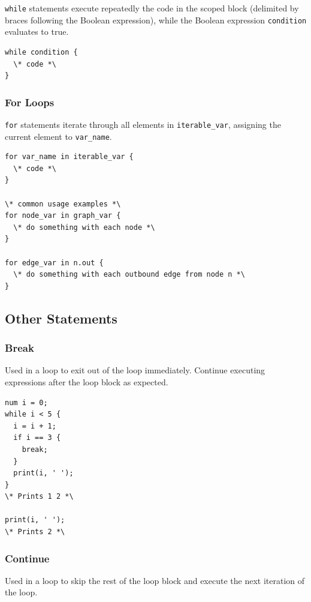 \documentclass{article}
\newcommand{\code}[1]{\texttt{#1}} %
\begin{document}
\code{while} statements execute repeatedly the code in the scoped block (delimited by braces following the Boolean expression), while the Boolean expression \code{condition} evaluates to true. 

\begin{lstlisting}[language=pltLang, label=lst:while-loop]
while condition {
  \* code *\
}

\end{lstlisting}

\subsubsection{For Loops}
\code{for} statements iterate through all elements in \code{iterable\_var}, assigning the current element to \code{var\_name}. 

\begin{lstlisting}[language=pltLang, label=lst:for-loop]
for var_name in iterable_var {
  \* code *\
}

\* common usage examples *\
for node_var in graph_var {
  \* do something with each node *\
}

for edge_var in n.out {
  \* do something with each outbound edge from node n *\
}

\end{lstlisting}

\subsection{Other Statements}

\subsubsection{Break}
Used in a loop to exit out of the loop immediately. Continue executing expressions after the loop block as expected.

\begin{lstlisting}[language=pltlang, label=lst:break-statement]
num i = 0;
while i < 5 {
  i = i + 1;
  if i == 3 {
    break;
  }
  print(i, ' ');
}
\* Prints 1 2 *\

print(i, ' ');
\* Prints 2 *\

\end{lstlisting}

\subsubsection{Continue}
Used in a loop to skip the rest of the loop block and execute the next iteration of the loop.
\end{document}
